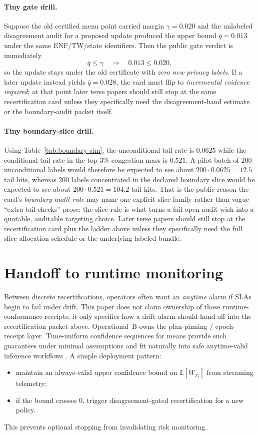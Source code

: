 \documentclass[11pt]{article}
\begin{document}
\paragraph{Tiny gate drill.}
Suppose the old certified menu point carried margin $\gamma=0.020$ and the unlabeled disagreement audit for a proposed update produced the upper bound $\overline q=0.013$ under the same ENF/TW/state identifiers.
Then the public gate verdict is immediately
\[
\overline q \le \gamma \quad\Rightarrow\quad 0.013 \le 0.020,
\]
so the update stays under the old certificate with \emph{zero new privacy labels}.
If a later update instead yields $\overline q=0.028$, the card must flip to \emph{incremental evidence required}; at that point later terse papers should still stop at the same recertification card unless they specifically need the disagreement-band estimate or the boundary-audit packet itself.

\paragraph{Tiny boundary-slice drill.}
Using Table~\ref{tab:boundary-sim}, the unconditional tail rate is $0.0625$ while the conditional tail rate in the top $3\%$ congestion mass is $0.521$.
A pilot batch of $200$ unconditional labels would therefore be expected to see about $200\cdot 0.0625 = 12.5$ tail hits, whereas $200$ labels concentrated in the declared boundary slice would be expected to see about $200\cdot 0.521 = 104.2$ tail hits.
That is the public reason the card's \emph{boundary-audit rule} may name one explicit slice family rather than vague ``extra tail checks'' prose: the slice rule is what turns a fail-open audit wish into a quotable, auditable targeting choice.
Later terse papers should still stop at the recertification card plus the ladder above unless they specifically need the full slice allocation schedule or the underlying labeled bundle.

\section{Handoff to runtime monitoring}

Between discrete recertifications, operators often want an \emph{anytime} alarm if SLAs begin to fail under drift. This paper does not claim ownership of those runtime-conformance receipts; it only specifies how a drift alarm should hand off into the recertification packet above. Operational~B owns the plan-pinning / epoch-receipt layer.\cite{series:operationalB}
Time-uniform confidence sequences for means provide such guarantees under minimal assumptions \cite{howard2021} and fit naturally into safe anytime-valid inference workflows \cite{ramdas2023savi}.
A simple deployment pattern:
\begin{itemize}
  \item maintain an always-valid upper confidence bound on $\mathbb{E}[W_{\pi_t}]$ from streaming telemetry;
  \item if the bound crosses $0$, trigger disagreement-gated recertification for a new policy.
\end{itemize}
This prevents optional stopping from invalidating risk monitoring.
\end{document}
